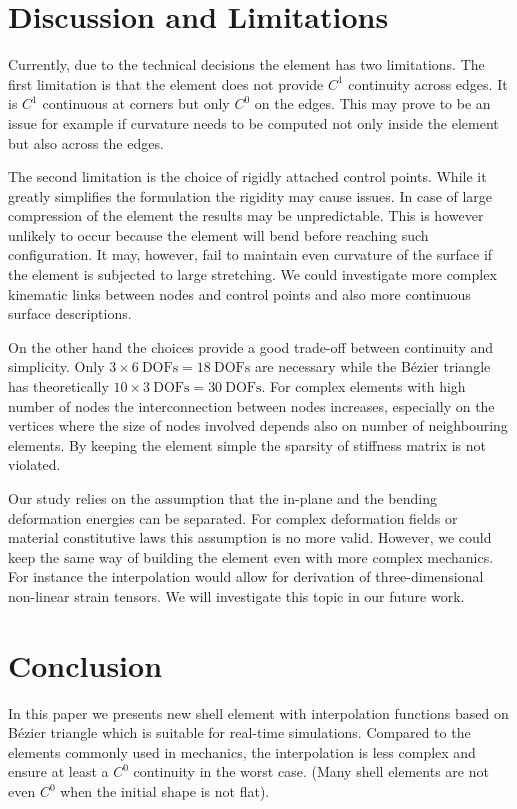 \documentclass{egpubl}
\begin{document}
\section{Discussion and Limitations} %

Currently, due to the technical decisions the element has two limitations.
The first limitation is that the element does not provide $C^1$ continuity
across edges. It is $C^1$ continuous at corners but only $C^0$ on the
edges. This may prove to be an issue for example if curvature needs to be
computed not only inside the element but also across the edges.

The second limitation is the choice of rigidly attached control points. 
While it greatly simplifies the formulation the rigidity may cause issues.
In case of large compression of the element the results may be
unpredictable. This is however unlikely to occur because the element will
bend before reaching such configuration. It may, however, fail to maintain
even curvature of the surface if the element is subjected to large
stretching.
We could investigate more complex kinematic links between nodes and control points 
and also more continuous surface descriptions.

On the other hand the choices provide a good trade-off between continuity
and simplicity. Only $ 3 \times 6~\mathrm{DOFs} = 18~\mathrm{DOFs}$ are
necessary while the B\'ezier triangle has theoretically $ 10 \times
3~\mathrm{DOFs} = 30~\mathrm{DOFs}$. For complex elements with high number
of nodes the interconnection between nodes increases, especially on the
vertices where the size of nodes involved depends also on number of
neighbouring elements. By keeping the element simple the sparsity of
stiffness matrix is not violated.

Our study relies on the assumption that the in-plane and the bending deformation energies can be separated.
For complex deformation fields or material constitutive laws  this assumption is no more valid.
However, we could keep the same way of building the element even with more complex mechanics. 
For instance the interpolation would allow for derivation of three-dimensional non-linear strain tensors.
We will investigate this topic in our future work.

\section{Conclusion} %

In this paper we presents new shell element with interpolation functions
based on B\'ezier triangle which is  suitable for real-time simulations.
Compared to  the elements commonly used in mechanics, the interpolation is less complex and ensure at least a $C^0$ continuity in the worst case. 
(Many shell elements are not even $C^0$ when the initial shape is not flat).
\end{document}
